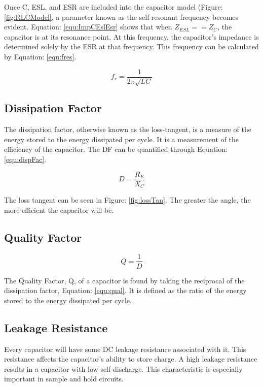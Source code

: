 Once C, ESL, and ESR are included into the capacitor model (Figure: \ref{fig:RLCModel}, a parameter known as the self-resonant frequency becomes evident. Equation: \eqref{equ:ImpCEslEsr} shows that when $Z_{ESL} == Z_C$, the capacitor is at its resonance point. At this frequency, the capacitor's impedance is determined solely by the ESR at that frequency. This frequency can be calculated by Equation: \eqref{equ:fres}.

\begin{equation}
\label{equ:fres}
f_r = \frac{1}{2\pi \sqrt{LC}}
\end{equation}

\subsection{Dissipation Factor}


The dissipation factor, otherwise known as the loss-tangent, is a measure of the energy stored to the energy dissipated per cycle. It is a measurement of the efficiency of the capacitor. The DF can be quantified through Equation: \eqref{equ:dispFac}. 

\begin{equation}
\label{equ:dispFac}
D = \frac{R_E}{X_C}
\end{equation}

The loss tangent can be seen in Figure: \ref{fig:lossTan}. The greater the angle, the more efficient the capacitor will be.

\subsection{Quality Factor}

\begin{equation}
\label{equ:qual}
Q = \frac{1}{D}
\end{equation}

The Quality Factor, Q, of a capacitor is found by taking the reciprocal of the dissipation factor, Equation: \eqref{equ:qual}. It is defined as the ratio of the energy stored to the energy dissipated per cycle.

\subsection{Leakage Resistance}

Every capacitor will have some DC leakage resistance associated with it. This resistance affects the capacitor's ability to store charge. A high leakage resistance results in a capacitor with low self-discharge. This characteristic is especially important in sample and hold circuits.

